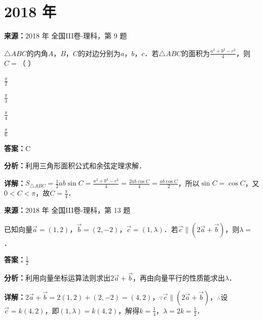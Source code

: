 \section*{2018 年}

\begin{question}[points=5]
\textbf{来源：}2018 年 全国III卷-理科，第 9 题\par
$\triangle ABC$的内角$A$，$B$，$C$的对边分别为$a$，$b$，$c$．若$\triangle ABC$的面积为$\frac{a^2+b^2-c^2}{4}$，则$C=$（ ）
\begin{choices}
  \item $\frac{\pi}{2}$
  \item $\frac{\pi}{3}$
  \item $\frac{\pi}{4}$
  \item $\frac{\pi}{6}$
\end{choices}
\begin{solution}
\textbf{答案：}C

\textbf{分析：}利用三角形面积公式和余弦定理求解．

\textbf{详解：}$S_{\triangle ABC}=\frac{1}{2}ab\sin C = \frac{a^2+b^2-c^2}{4} = \frac{2ab\cos C}{4} = \frac{ab\cos C}{2}$，所以$\sin C = \cos C$，又$0<C<\pi$，故$C=\frac{\pi}{4}$．
\end{solution}
\end{question}

\begin{question}[points=5]
\textbf{来源：}2018 年 全国III卷-理科，第 13 题\par
已知向量$\vec{a}=(1,2)$，$\vec{b}=(2,-2)$，$\vec{c}=(1,\lambda)$．若$\vec{c}\parallel(2\vec{a}+\vec{b})$，则$\lambda=$．
\fillin[{$\frac{1}{2}$}]
\begin{solution}
\textbf{答案：}$\frac{1}{2}$

\textbf{分析：}利用向量坐标运算法则求出$2\vec{a}+\vec{b}$，再由向量平行的性质能求出$\lambda$．

\textbf{详解：}$2\vec{a}+\vec{b}=2(1,2)+(2,-2)=(4,2)$，$\because \vec{c}\parallel(2\vec{a}+\vec{b})$，$\therefore$设$\vec{c}=k(4,2)$，即$(1,\lambda)=k(4,2)$，解得$k=\frac{1}{4}$，$\lambda=2k=\frac{1}{2}$．
\end{solution}
\end{question}


